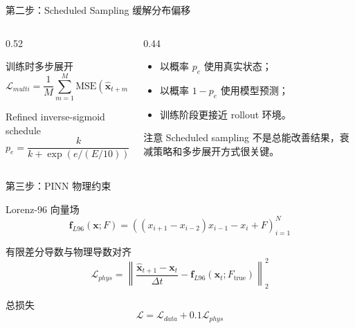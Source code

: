 \documentclass[UTF8,aspectratio=169,11pt]{ctexbeamer}
\newcommand{\xvec}{\mathbf{x}}
\newcommand{\dt}{\Delta t}
\newcommand{\mse}{\mathrm{MSE}}
\begin{document}
\begin{frame}{第二步：Scheduled Sampling 缓解分布偏移}
    \begin{columns}[T,onlytextwidth]
        \begin{column}{0.52\textwidth}
            \begin{block}{训练时多步展开}
                \[
                \mathcal{L}_{multi}=
                \frac{1}{M}\sum_{m=1}^{M}
                \mse(\hat{\xvec}_{t+m},\xvec_{t+m}),\quad M=5
                \]
            \end{block}
            \begin{block}{Refined inverse-sigmoid schedule}
                \[
                p_e=\frac{k}{k+\exp(e/(E/10))}
                \]
            \end{block}
        \end{column}
        \begin{column}{0.44\textwidth}
            \begin{itemize}
                \item 以概率 $p_e$ 使用真实状态；
                \item 以概率 $1-p_e$ 使用模型预测；
                \item 训练阶段更接近 rollout 环境。
            \end{itemize}
            \begin{alertblock}{注意}
                Scheduled sampling 不是总能改善结果，衰减策略和多步展开方式很关键。
            \end{alertblock}
        \end{column}
    \end{columns}
\end{frame}

\begin{frame}{第三步：PINN 物理约束}
    \begin{block}{Lorenz-96 向量场}
        \[
        \mathbf{f}_{L96}(\xvec;F)=
        \left((x_{i+1}-x_{i-2})x_{i-1}-x_i+F\right)_{i=1}^{N}
        \]
    \end{block}
    \begin{block}{有限差分导数与物理导数对齐}
        \[
        \mathcal{L}_{phys}=
        \left\|
        \frac{\hat{\xvec}_{t+1}-\xvec_t}{\dt}
        -
        \mathbf{f}_{L96}(\xvec_t;F_{\mathrm{true}})
        \right\|_2^2
        \]
    \end{block}
    \begin{block}{总损失}
        \[
        \mathcal{L}=\mathcal{L}_{data}+0.1\mathcal{L}_{phys}
        \]
    \end{block}
\end{frame}
\end{document}
